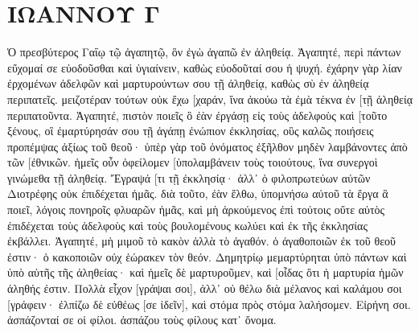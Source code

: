 \section{ΙΩΑΝΝΟΥ Γ}
Ὁ πρεσβύτερος Γαΐῳ τῷ ἀγαπητῷ, ὃν ἐγὼ ἀγαπῶ ἐν ἀληθείᾳ. 
Ἀγαπητέ, περὶ πάντων εὔχομαί σε εὐοδοῦσθαι καὶ ὑγιαίνειν, καθὼς εὐοδοῦταί σου ἡ ψυχή. 
ἐχάρην γὰρ λίαν ἐρχομένων ἀδελφῶν καὶ μαρτυρούντων σου τῇ ἀληθείᾳ, καθὼς σὺ ἐν ἀληθείᾳ περιπατεῖς. 
μειζοτέραν τούτων οὐκ ἔχω [χαράν, ἵνα ἀκούω τὰ ἐμὰ τέκνα ἐν [τῇ ἀληθείᾳ περιπατοῦντα. 
Ἀγαπητέ, πιστὸν ποιεῖς ὃ ἐὰν ἐργάσῃ εἰς τοὺς ἀδελφοὺς καὶ [τοῦτο ξένους, 
οἳ ἐμαρτύρησάν σου τῇ ἀγάπῃ ἐνώπιον ἐκκλησίας, οὓς καλῶς ποιήσεις προπέμψας ἀξίως τοῦ θεοῦ· 
ὑπὲρ γὰρ τοῦ ὀνόματος ἐξῆλθον μηδὲν λαμβάνοντες ἀπὸ τῶν [ἐθνικῶν. 
ἡμεῖς οὖν ὀφείλομεν [ὑπολαμβάνειν τοὺς τοιούτους, ἵνα συνεργοὶ γινώμεθα τῇ ἀληθείᾳ. 
Ἔγραψά [τι τῇ ἐκκλησίᾳ· ἀλλ᾽ ὁ φιλοπρωτεύων αὐτῶν Διοτρέφης οὐκ ἐπιδέχεται ἡμᾶς. 
διὰ τοῦτο, ἐὰν ἔλθω, ὑπομνήσω αὐτοῦ τὰ ἔργα ἃ ποιεῖ, λόγοις πονηροῖς φλυαρῶν ἡμᾶς, καὶ μὴ ἀρκούμενος ἐπὶ τούτοις οὔτε αὐτὸς ἐπιδέχεται τοὺς ἀδελφοὺς καὶ τοὺς βουλομένους κωλύει καὶ ἐκ τῆς ἐκκλησίας ἐκβάλλει. 
Ἀγαπητέ, μὴ μιμοῦ τὸ κακὸν ἀλλὰ τὸ ἀγαθόν. ὁ ἀγαθοποιῶν ἐκ τοῦ θεοῦ ἐστιν· ὁ κακοποιῶν οὐχ ἑώρακεν τὸν θεόν. 
Δημητρίῳ μεμαρτύρηται ὑπὸ πάντων καὶ ὑπὸ αὐτῆς τῆς ἀληθείας· καὶ ἡμεῖς δὲ μαρτυροῦμεν, καὶ [οἶδας ὅτι ἡ μαρτυρία ἡμῶν ἀληθής ἐστιν. 
Πολλὰ εἶχον [γράψαι σοι], ἀλλ᾽ οὐ θέλω διὰ μέλανος καὶ καλάμου σοι [γράφειν· 
ἐλπίζω δὲ εὐθέως [σε ἰδεῖν], καὶ στόμα πρὸς στόμα λαλήσομεν. 
Εἰρήνη σοι. ἀσπάζονταί σε οἱ φίλοι. ἀσπάζου τοὺς φίλους κατ᾽ ὄνομα. 

